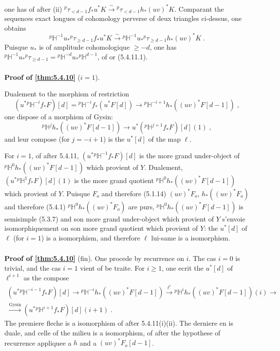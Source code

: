 \documentclass[12pt,a4paper]{article}
\theoremstyle{plain}
\theoremstyle{definition}
\theoremstyle{remark}
\newcommand{\HH}{\mathbb{H}}
\begin{document}
one has of after (ii) ${}^{p}\tau_{<d-1}f_*u^*K \xrightarrow{\sim} {}^{p}\tau_{<d-1}h_*(uv)^*K$. Comparant the sequences exact longues of cohomology perverse of deux triangles ci-dessus, one obtains
\[
{}^{p}\HH^{-1}u_*{}^{p}\tau_{\geq d-1}f_*u^*K \xrightarrow{\sim} {}^{p}\HH^{-1}u_*{}^{p}\tau_{\geq d-1}h_*(uv)^*K\;.
\]
Puisque $u_*$ is of amplitude cohomologique $\geq -d$, one has ${}^{p}\HH^{-1}u_*{}^{p}\tau_{\geq d-1} = {}^{p}\HH^{-d}u_*{}^{p}\HH^{d-1}$, of or (5.4.11.1).

\subsubsection{}
\textbf{Proof of \ref{thm:5.4.10}} ($i = 1$).

Dualement to the morphism of restriction
\[
(u^*{}^{p}\HH^{-i}f_*F)[d] = {}^{p}\HH^{-i}f_*(u^*F[d]) \longrightarrow {}^{p}\HH^{-i+1}h_*((uv)^*F[d-1])\;,
\]
one dispose of a morphism of Gysin:
\[
{}^{p}\HH^jh_*((uv)^*F[d-1]) \longrightarrow u^*({}^{p}\HH^{j+1}f_*F)[d](1)\;,
\]
and leur compose (for $j = -i+1$) is the $u^*[d]$ of the map $\ell$.

For $i = 1$, of after 5.4.11, $(u^*{}^{p}\HH^{-1}f_*F)[d]$ is the more grand under-object of ${}^{p}\HH^0h_*((uv)^*F[d-1])$ which provient of $Y$. Dualement, $(u^*{}^{p}\HH^1f_*F)[d](1)$ is the more grand quotient ${}^{p}\HH^0h_*((uv)^*F[d-1])$ which provient of $Y$. Puisque $F_o$ and therefore (5.1.14) $(uv)^*F_o$, $h_*((uv)^*F_o)$ and therefore (5.4.1) ${}^{p}\HH^0h_*((uv)^*F_o)$ are purs, ${}^{p}\HH^0h_*((uv)^*F[d-1])$ is semisimple (5.3.7) and son more grand under-object which provient of $Y$ s'envoie isomorphiquement on son more grand quotient which provient of $Y$: the $u^*[d]$ of $\ell$ (for $i=1$) is a isomorphism, and therefore $\ell$ lui-same is a isomorphism.

\subsubsection{}
\textbf{Proof of \ref{thm:5.4.10}} (fin). One procede by recurrence on $i$. The cas $i = 0$ is trivial, and the cas $i = 1$ vient of be traite. For $i \geq 1$, one ecrit the $u^*[d]$ of $\ell^{i+1}$ as the compose
\begin{multline*}
(u^*{}^{p}\HH^{-i-1}f_*F)[d] \to {}^{p}\HH^{-i}h_*((uv)^*F[d-1]) \xrightarrow{\ell^i} {}^{p}\HH^ih_*((uv)^*F[d-1])(i) \to \\
\xrightarrow{\text{Gysin}} (u^*{}^{p}\HH^{i+1}f_*F)[d](i+1)\;.
\end{multline*}
The premiere fleche is a isomorphism of after 5.4.11(i)(ii). The derniere en is duale, and celle of the milieu is a isomorphism, of after the hypothese of recurrence appliquee a $h$ and a $(uv)^*F_o[d-1]$.
\end{document}
